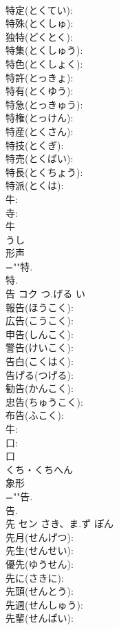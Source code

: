 \documentclass[8pt]{extreport}
\begin{document}
\begin{CJK}{UTF8}{min}
\\	特定(とくてい): 
\\	特殊(とくしゅ): 
\\	独特(どくとく): 
\\	特集(とくしゅう): 
\\	特色(とくしょく): 
\\	特許(とっきょ): 
\\	特有(とくゆう): 
\\	特急(とっきゅう): 
\\	特権(とっけん): 
\\	特産(とくさん): 
\\	特技(とくぎ): 
\\	特売(とくばい): 
\\	特長(とくちょう): 
\\	特派(とくは): 
\\	牛: 
\\	寺: 
\\	牛	
\\	うし	
\\	形声 
\\	=""特.
\\	特.
\\	告	コク	つ.げる	い	
\\	報告(ほうこく): 
\\	広告(こうこく): 
\\	申告(しんこく): 
\\	警告(けいこく): 
\\	告白(こくはく): 
\\	告げる(つげる): 
\\	勧告(かんこく): 
\\	忠告(ちゅうこく): 
\\	布告(ふこく): 
\\	牛: 
\\	口: 
\\	口	
\\	くち・くちへん	
\\	象形 
\\	=""告.
\\	告.
\\	先	セン	さき、ま.ず	ぽん	
\\	先月(せんげつ): 
\\	先生(せんせい): 
\\	優先(ゆうせん): 
\\	先に(さきに): 
\\	先頭(せんとう): 
\\	先週(せんしゅう): 
\\	先輩(せんぱい): 

\end{CJK}
\end{document}
